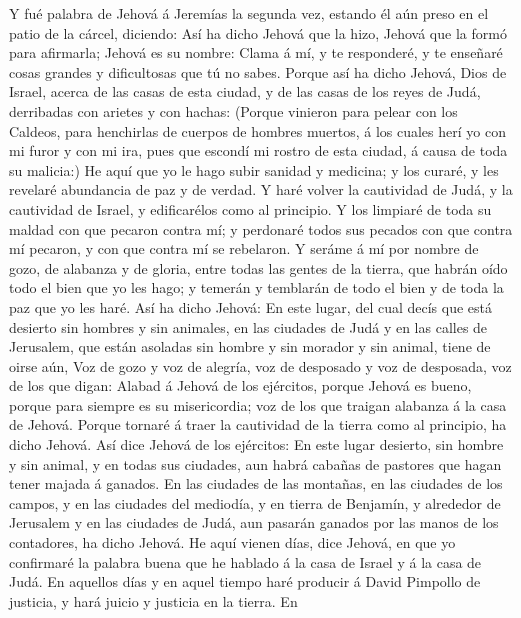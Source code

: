  Y fué palabra de Jehová á Jeremías la segunda vez, estando
él aún preso en el patio de la cárcel, diciendo:  Así ha
dicho Jehová que la hizo, Jehová que la formó para afirmarla; Jehová es
su nombre:  Clama á mí, y te responderé, y te enseñaré cosas
grandes y dificultosas que tú no sabes.  Porque así ha dicho
Jehová, Dios de Israel, acerca de las casas de esta ciudad, y de las
casas de los reyes de Judá, derribadas con arietes y con hachas:
 (Porque vinieron para pelear con los Caldeos, para
henchirlas de cuerpos de hombres muertos, á los cuales herí yo con mi
furor y con mi ira, pues que escondí mi rostro de esta ciudad, á causa
de toda su malicia:)  He aquí que yo le hago subir sanidad y
medicina; y los curaré, y les revelaré abundancia de paz y de verdad.
 Y haré volver la cautividad de Judá, y la cautividad de
Israel, y edificarélos como al principio.  Y los limpiaré de
toda su maldad con que pecaron contra mí; y perdonaré todos sus pecados
con que contra mí pecaron, y con que contra mí se rebelaron.
 Y seráme á mí por nombre de gozo, de alabanza y de gloria,
entre todas las gentes de la tierra, que habrán oído todo el bien que yo
les hago; y temerán y temblarán de todo el bien y de toda la paz que yo
les haré.  Así ha dicho Jehová: En este lugar, del cual
decís que está desierto sin hombres y sin animales, en las ciudades de
Judá y en las calles de Jerusalem, que están asoladas sin hombre y sin
morador y sin animal, tiene de oirse aún,  Voz de gozo y
voz de alegría, voz de desposado y voz de desposada, voz de los que
digan: Alabad á Jehová de los ejércitos, porque Jehová es bueno, porque
para siempre es su misericordia; voz de los que traigan alabanza á la
casa de Jehová. Porque tornaré á traer la cautividad de la tierra como
al principio, ha dicho Jehová.  Así dice Jehová de los
ejércitos: En este lugar desierto, sin hombre y sin animal, y en todas
sus ciudades, aun habrá cabañas de pastores que hagan tener majada á
ganados.  En las ciudades de las montañas, en las ciudades
de los campos, y en las ciudades del mediodía, y en tierra de Benjamín,
y alrededor de Jerusalem y en las ciudades de Judá, aun pasarán ganados
por las manos de los contadores, ha dicho Jehová.  He aquí
vienen días, dice Jehová, en que yo confirmaré la palabra buena que he
hablado á la casa de Israel y á la casa de Judá.  En
aquellos días y en aquel tiempo haré producir á David Pimpollo de
justicia, y hará juicio y justicia en la tierra.  En
